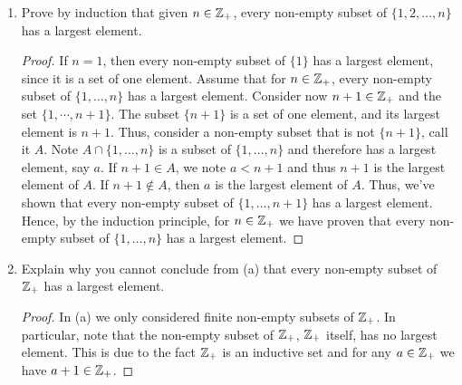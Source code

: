 \documentclass[12pt]{article}
\begin{document}
	\begin{enumerate}[label=(\alph*)]
		\item Prove by induction that given $n \in \mathbb{Z}_{+}$, every non-empty subset of $\{1, 2, \ldots, n\}$
		has a largest element.
		\begin{proof}
			If $n = 1$, then every  non-empty subset of $\{1\}$ has a largest element, since it is a 
			set of one element. Assume that for $n \in \mathbb{Z}_{+}$, every non-empty subset of $\{1, \ldots, n\}$
			has a largest element. Consider now $n + 1 \in \mathbb{Z}_{+}$ and the set $\{1, \cdots, n + 1\}$.
			The subset $\{n + 1\}$ is a set of one element, and its largest element is $n + 1$. Thus, consider
			a non-empty subset that is not $\{n + 1\}$, call it $A$. Note $A \cap \{1, \ldots, n\}$ is a subset
			of $\{1, \ldots, n\}$ and therefore has a largest element, say $a$. If $n + 1 \in A$, we note
			$a < n + 1$ and thus $n + 1$ is the largest element of $A$. If $n+1 \notin A$, then 
			$a$ is the largest element of $A$. Thus, we've shown that every non-empty subset of 
			$\{1, \ldots, n+1\}$ has a largest element. Hence, by the induction principle, for $n \in \mathbb{Z}_{+}$
			we have proven that every non-empty subset of $\{1, \ldots, n\}$ has a largest element.
		\end{proof}
		\item Explain why you cannot conclude from (a) that every non-empty subset of $\mathbb{Z}_{+}$ has a 
		largest element.
		\begin{proof}
			In (a) we only considered finite non-empty subsets of $\mathbb{Z}_{+}$. In particular, note that the 
			non-empty subset of $\mathbb{Z}_{+}$, $\mathbb{Z}_{+}$ itself, has no largest element. This is due to the fact
			$\mathbb{Z}_{+}$ is an inductive set and for any $a \in \mathbb{Z}_{+}$ we have $a + 1 \in \mathbb{Z}_{+}$.			
		\end{proof}
	\end{enumerate}
	
\end{document}
